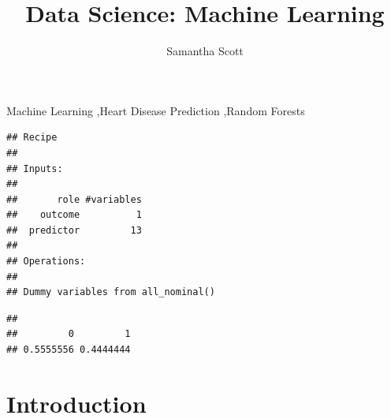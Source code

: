 \documentclass[11pt,preprint, authoryear]{elsarticle}
\numberwithin{equation}{section}
\numberwithin{figure}{section}
\numberwithin{table}{section}
\begin{document}
\begin{frontmatter}  %

\title{Data Science: Machine Learning}





\author[Add1]{Samantha Scott}





\address[Add1]{Stellenbosch University, Cape Town, South Africa}



\vspace{1cm}


\begin{keyword}
\footnotesize{
Machine Learning \sep Heart Disease Prediction \sep Random Forests \\
\vspace{0.3cm}
}
\end{keyword}



\vspace{0.5cm}

\end{frontmatter}


\newpage
\renewcommand{\contentsname}{Table of Contents}
{\tableofcontents}
\newpage

\pagestyle{fancy}
\chead{}
\lfoot{}
\lhead{}
\cfoot{}


\headsep 35pt %




\begin{verbatim}
## Recipe
## 
## Inputs:
## 
##       role #variables
##    outcome          1
##  predictor         13
## 
## Operations:
## 
## Dummy variables from all_nominal()
\end{verbatim}

\begin{verbatim}
## 
##         0         1 
## 0.5555556 0.4444444
\end{verbatim}

\hypertarget{introduction}{%
\section{Introduction}\label{introduction}}
\end{document}
